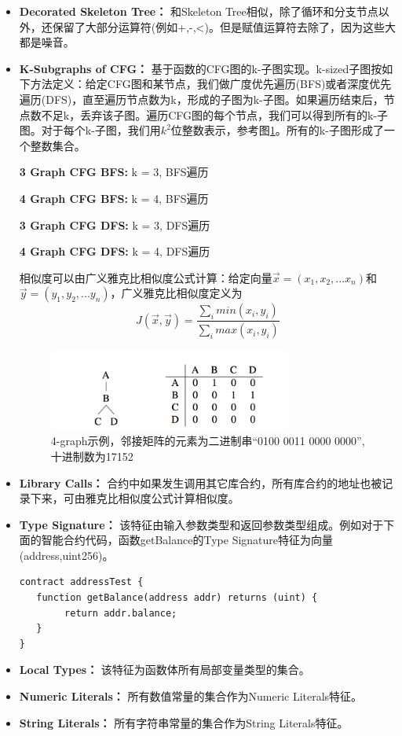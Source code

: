 \begin{itemize}
	\item \textbf{Decorated Skeleton Tree：} 和Skeleton Tree相似，除了循环和分支节点以外，还保留了大部分运算符(例如+,-,<)。但是赋值运算符去除了，因为这些大都是噪音。
	\item \textbf{K-Subgraphs of CFG：} 基于函数的CFG图的k-子图实现。k-sized子图按如下方法定义：给定CFG图和某节点，我们做广度优先遍历(BFS)或者深度优先遍历(DFS)，直至遍历节点数为k，形成的子图为k-子图。如果遍历结束后，节点数不足k，丢弃该子图。遍历CFG图的每个节点，我们可以得到所有的k-子图。对于每个k-子图，我们用$k^{2}$位整数表示，参考图\ref{fig:graph-ex}。所有的k-子图形成了一个整数集合。
	
	\textbf{3 Graph CFG BFS:} k = 3, BFS遍历
	
	\textbf{4 Graph CFG BFS:} k = 4, BFS遍历
	
	\textbf{3 Graph CFG DFS:} k = 3, DFS遍历
	
	\textbf{4 Graph CFG DFS:} k = 4, DFS遍历
	
	相似度可以由广义雅克比相似度公式计算：给定向量$\vec{x}=(x_{1},x_{2},...x_{n})$和$\vec{y}=(y_{1},y_{2},...y_{n})$，广义雅克比相似度定义为
	\begin{equation}
	J(\vec{x},\vec{y})=\frac{\sum_imin(x_{i},y_{i})}{\sum_imax(x_{i},y_{i})}
	\end{equation}
	
	
	\begin{figure}[h]
	\centering
	\includegraphics[width=8cm]{./figs/graph-matrix.png}
	\caption{4-graph示例，邻接矩阵的元素为二进制串“0100 0011 0000 0000”, 十进制数为17152}
	\label{fig:graph-ex}
	\end{figure}


	\item \textbf{Library Calls：} 合约中如果发生调用其它库合约，所有库合约的地址也被记录下来，可由雅克比相似度公式计算相似度。
	\item \textbf{Type Signature：} 该特征由输入参数类型和返回参数类型组成。例如对于下面的智能合约代码，函数getBalance的Type Signature特征为向量(address,uint256)。
	
	\begin{lstlisting}[frame=single]
contract addressTest {
   function getBalance(address addr) returns (uint) {
   		return addr.balance;
   }
}
	\end{lstlisting}
	
	\item \textbf{Local Types：} 该特征为函数体所有局部变量类型的集合。
	\item \textbf{Numeric Literals：} 所有数值常量的集合作为Numeric Literals特征。
	\item \textbf{String Literals：} 所有字符串常量的集合作为String Literals特征。
\end{itemize}

